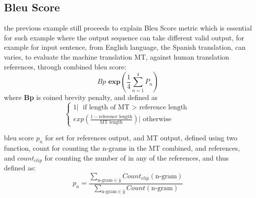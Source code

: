 \documentclass[4apaper,12pt]{book}
\begin{document}
\begin{description}
\begin{description}
\begin{description}
          \subsection{Bleu Score}
          \begin{description}
          \item the previous example still proceeds to explain Bleu Score metric which is essential for such example where the output sequence can take different valid output, for example for input sentence, from English language, the Spanish translation, can varies, to evaluate the machine translation MT, against human translation references, through combined bleu score: $$ Bp\textbf{ exp}(\frac{1}{4}\sum_{n=1}^4P_n) $$ where \textbf{Bp} is coined brevity penalty, and defined as $$\begin{cases} 1 | \text{  if length of MT $>$ reference length} \\ exp(\frac{1-\text{reference length}}{\text{MT length}}) | \text{  otherwise}\end{cases}$$
          \item bleu score $p_n$ for set for references output, and MT output, defined using two function, count for counting the n-grams in the MT combined, and references, and $count_{clip}$ for counting the number of  in any of the references, and thus defined as: $$ p_n = \frac{\sum_{\text{n-gram} \in \hat{y}} Count_{clip}(\text{n-gram})}{\sum_{\text{n-gram} \in \hat{y}} Count(\text{n-gram})} $$
          \end{description}
      \end{description}
    \end{description}
  \end{description}
\end{document}
